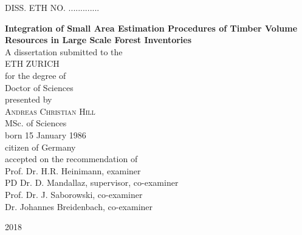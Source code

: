 

\begin{titlepage}

\begin{center}

\textsc{DISS. ETH NO. .............}

\vspace*{2cm}
\Large
\textbf{Integration of Small Area Estimation Procedures of Timber Volume Resources in Large Scale Forest Inventories}\\

\vspace*{1cm}
A dissertation submitted to the \\
ETH ZURICH \\

\vspace*{1cm}
for the degree of \\
Doctor of Sciences \\

\vspace*{1cm}
presented by \\
\vspace*{0.5cm}
\textsc{Andreas Christian Hill} \\
MSc. of Sciences \\
\vspace*{0.5cm}
born 15 January 1986 \\
citizen of Germany \\

\vspace*{1cm}
accepted on the recommendation of\\
Prof. Dr. H.R. Heinimann, examiner\\
PD Dr. D. Mandallaz, supervisor, co-examiner\\
Prof. Dr. J. Saborowski, co-examiner\\
Dr. Johannes Breidenbach, co-examiner

\vspace{3cm}
2018\\


\end{center}

\end{titlepage}